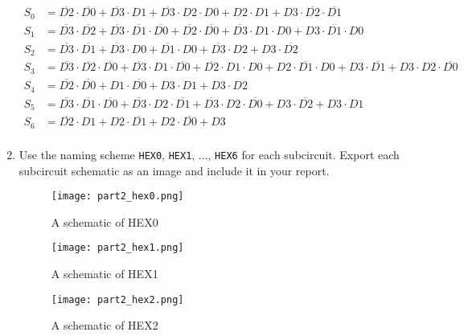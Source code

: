 \documentclass{article}
\begin{document}
\begin{enumerate}
\begin{align*}
    S_0 &= \overline{D2}  \cdot  \overline{D0} + \overline{D3}  \cdot D1+ \overline{D3}  \cdot D2 \cdot D0+D2 \cdot D1+D3 \cdot  \overline{D2}  \cdot  \overline{D1} \\
    S_1 &= \overline{D3}  \cdot  \overline{D2} + \overline{D3}  \cdot  \overline{D1}  \cdot  \overline{D0} + \overline{D2}  \cdot  \overline{D0} + \overline{D3}  \cdot D1 \cdot D0+D3 \cdot  \overline{D1}  \cdot D0 \\
    S_2 &= \overline{D3}  \cdot  \overline{D1} + \overline{D3}  \cdot D0+ \overline{D1}  \cdot D0+ \overline{D3}  \cdot D2+D3 \cdot  \overline{D2} \\
    S_3 &= \overline{D3}  \cdot  \overline{D2}  \cdot  \overline{D0} + \overline{D3}  \cdot D1 \cdot  \overline{D0} + \overline{D2}  \cdot D1 \cdot D0+D2 \cdot  \overline{D1}  \cdot D0+D3 \cdot  \overline{D1} +D3 \cdot D2 \cdot  \overline{D0} \\
    S_4 &= \overline{D2}  \cdot  \overline{D0} +D1 \cdot  \overline{D0} +D3 \cdot D1+D3 \cdot D2 \\
    S_5 &=  \overline{D3}  \cdot  \overline{D1}  \cdot  \overline{D0} + \overline{D3}  \cdot D2 \cdot  \overline{D1} + \overline{D3}  \cdot D2 \cdot  \overline{D0} +D3 \cdot  \overline{D2} +D3 \cdot D1 \\
    S_6 &=  \overline{D2}  \cdot D1+D2 \cdot  \overline{D1} +D2 \cdot  \overline{D0} +D3 \\
\end{align*}

\item Use the naming scheme \verb|HEX0|, \verb|HEX1|, ..., \verb|HEX6| for each subcircuit.
    Export each subcircuit schematic as an image and include it in your report.

\begin{figure}[ht!]
    \centering
    \texttt{[image: part2\_hex0.png]}
    \caption{A schematic of HEX0}
    \label{f:part2_hex0}
\end{figure}

\begin{figure}[ht!]
    \centering
    \texttt{[image: part2\_hex1.png]}
    \caption{A schematic of HEX1}
    \label{f:part2_hex1}
\end{figure}

\begin{figure}[ht!]
    \centering
    \texttt{[image: part2\_hex2.png]}
    \caption{A schematic of HEX2}
    \label{f:part2_hex2}
\end{figure}



\end{enumerate}
\end{document}
